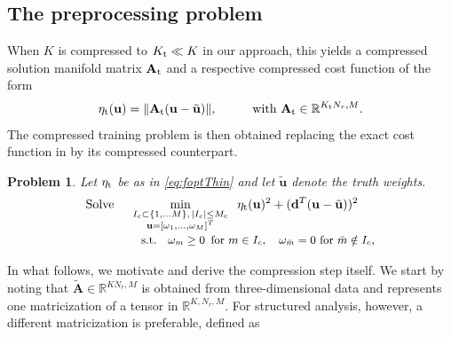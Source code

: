 \documentclass[onefignum,onetabnum]{siamart251104}
\newcommand{\bv}[1]{{\mathbf #1}}
\newcommand{\bt}[1]{{\mathbf{#1}}}
\newcommand{\com}[1]{{{#1}_{\rm{c}}}} %
\newcommand{\prol}[1]{{{#1}_{\rm{p}}}} %
\newcommand{\thi}[1]{{{#1}_{\rm{t}}}}	%
\newcommand{\Nr}{{N_r}}
\newcommand{\R}{\mathbb{R}}
\newcommand{\wei}{{\omega}} %
\newcommand{\vwei}{\bv{u}} %
\newcommand{\Ap}{{\bt{A}}}
\newcommand{\fopt}{{\eta}}
\newcommand{\dreg}{{{\bv{d}}}}
\newtheorem{prblm}{Problem} %
\begin{document}
\subsection{The preprocessing problem}\label{subsec:preprocessing-ansatz}
When $K$ is compressed to $\thi{K} \ll K$ in our approach, this yields a compressed solution manifold matrix $\thi{\Ap}$ and a respective compressed cost function of the form
\begin{align} \label{eq:foptThin}
	\thi{\fopt}(\vwei) = \| \thi{\Ap}( \vwei - \tilde{\vwei}) \|, \hspace{1cm} \text{with } \thi{\Ap}\in \R^{\thi{K}\Nr , M}.
\end{align}
The compressed training problem is then obtained replacing the exact cost function in  by its compressed counterpart.
\begin{prblm} \label{prob:con-CrTrain}
Let $\thi{\fopt}$ be as in \eqref{eq:foptThin} and let $\tilde{\vwei}$ denote the truth weights.
\begin{align*} 
\text{Solve \quad}	 &\min_{ \substack{I_c\subset \{1,\ldots M\}, \, |I_c | \leq \com{M} \\  \vwei=[\wei_1,\ldots,\wei_M]^T } }  \hspace{0.2cm} \thi{\fopt}(\vwei)^2 + (\dreg^T( \vwei -  \tilde{\vwei}))^2
 \\[-0.1cm]
	& \hspace{0.3cm} {\small \smash{ \text{s.t.}  \quad \wei_m \geq 0 \, \text{ for } m \in I_c, \quad \wei_{\bar{m}}  = 0 \text{ for } \bar{m}  \notin I_c  }},
\end{align*}
\end{prblm}
In what follows, we motivate and derive the compression step itself.
We start by noting that $\tilde{\Ap} \in \mathbb{R}^{K\Nr , M}$ is obtained from three-dimensional data and represents one matricization of a tensor in $\mathbb{R}^{K , \Nr , M}$. For structured analysis, however, a different matricization is preferable, defined as
\end{document}
